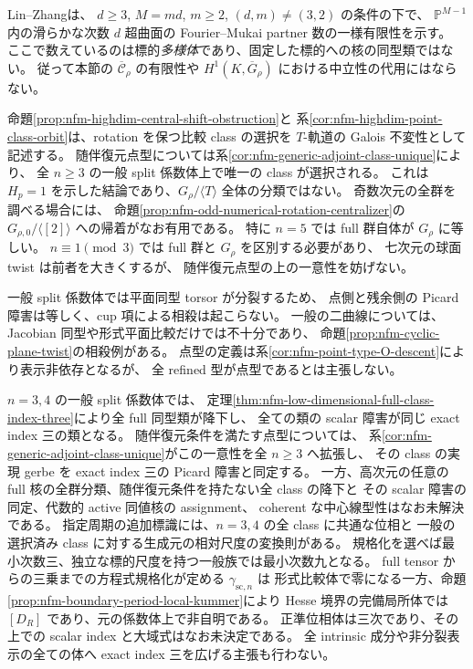 Lin--Zhang\cite[Theorem~1.3]{NFMLinZhangPartners}は、
$d\ge3$, $M=md$, $m\ge2$, $(d,m)\ne(3,2)$ の条件の下で、
$\mathbb P^{M-1}$ 内の滑らかな次数 $d$ 超曲面の
Fourier--Mukai partner 数の一様有限性を示す。
ここで数えているのは標的\emph{多様体}であり、固定した標的への核の同型類ではない。
従って本節の $\overline{\mathscr C}_\rho$ の有限性や
$H^1(K,\overline G_\rho)$ における中立性の代用にはならない。

命題\ref{prop:nfm-highdim-central-shift-obstruction}と
系\ref{cor:nfm-highdim-point-class-orbit}は、rotation を保つ比較 class の選択を
$T$-軌道の Galois 不変性として記述する。
随伴復元点型については系\ref{cor:nfm-generic-adjoint-class-unique}により、
全 $n\ge3$ の一般 split 係数体上で唯一の class が選択される。
これは $H_p=1$ を示した結論であり、$G_\rho/\langle T\rangle$ 全体の分類ではない。
奇数次元の全群を調べる場合には、
命題\ref{prop:nfm-odd-numerical-rotation-centralizer}の
$G_{\rho,0}/\langle[2]\rangle$ への帰着がなお有用である。
特に $n=5$ では full 群自体が $G_\rho$ に等しい。
$n\equiv1\pmod3$ では full 群と $G_\rho$ を区別する必要があり、
七次元の球面 twist は前者を大きくするが、
随伴復元点型の上の一意性を妨げない。

\begin{remark}[一般点の結論と残る範囲]
一般 split 係数体では平面同型 torsor が分裂するため、
点側と残余側の Picard 障害は等しく、cup 項による相殺は起こらない。
一般の二曲線については、Jacobian 同型や形式平面比較だけでは不十分であり、
命題\ref{prop:nfm-cyclic-plane-twist}の相殺例がある。
点型の定義は系\ref{cor:nfm-point-type-O-descent}により表示非依存となるが、
全 refined 型が点型であるとは主張しない。

$n=3,4$ の一般 split 係数体では、
定理\ref{thm:nfm-low-dimensional-full-class-index-three}により全 full 同型類が降下し、
全ての類の scalar 障害が同じ exact index 三の類となる。
随伴復元条件を満たす点型については、
系\ref{cor:nfm-generic-adjoint-class-unique}がこの一意性を全 $n\ge3$ へ拡張し、
その class の実現 gerbe を exact index 三の Picard 障害と同定する。
一方、高次元の任意の full 核の全群分類、随伴復元条件を持たない全 class の降下と
その scalar 障害の同定、代数的 active 同値核の assignment、
coherent な中心線型性はなお未解決である。
指定周期の追加標識には、$n=3,4$ の全 class に共通な位相と
一般の選択済み class に対する生成元の相対尺度の変換則がある。
規格化を選べば最小次数三、独立な標的尺度を持つ一般族では最小次数九となる。
full tensor からの三乗までの方程式規格化が定める $\gamma_{\mathrm{sc},n}$ は
形式比較体で零になる一方、命題\ref{prop:nfm-boundary-period-local-kummer}により
Hesse 境界の完備局所体では $[D_R]$ であり、元の係数体上で非自明である。
正準位相体は三次であり、その上での scalar index と大域式はなお未決定である。
全 intrinsic 成分や非分裂表示の全ての体へ exact index 三を広げる主張も行わない。
\end{remark}
